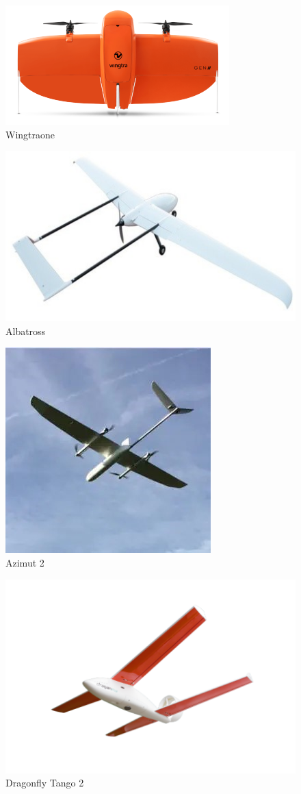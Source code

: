 \documentclass[12 pt]{article}
\begin{document}
\begin{figure}[h!]
    \centering
    \includegraphics[width=0.7\linewidth]{Aircraft pics/WingtraOne.png}
    \caption{Wingtraone}
    \label{fig:enter-label}
\end{figure}

\begin{figure}[h!]
    \centering
    \includegraphics[width=0.7\linewidth]{Aircraft pics/Albatross.jpg}
    \caption{Albatross}
    \label{fig:enter-label}
\end{figure}

\vspace{\fill}

\newpage

\begin{figure}[h!]
    \centering
    \includegraphics[width=0.35\linewidth]{Aircraft pics/Azimut.jpg}
    \caption{Azimut 2}
    \label{fig:enter-label}
\end{figure}

\begin{figure}[h!]
    \centering
    \includegraphics[width=0.55\linewidth]{Aircraft pics/Dragonfly.png}
    \caption{Dragonfly Tango 2}
    \label{fig:enter-label}
\end{figure}
\end{document}
